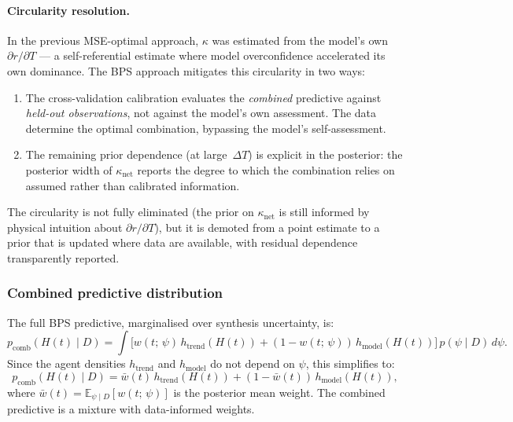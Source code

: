 \documentclass[11pt]{article}
\newcommand{\dT}{\Delta T}
\begin{document}
\paragraph{Circularity resolution.}
\label{sec:kappa_circularity}
In the previous MSE-optimal approach, $\kappa$ was estimated from the model's own $\partial r / \partial T$ --- a self-referential estimate where model overconfidence accelerated its own dominance.  The BPS approach mitigates this circularity in two ways:
\begin{enumerate}
  \item The cross-validation calibration evaluates the \emph{combined} predictive against \emph{held-out observations}, not against the model's own assessment.  The data determine the optimal combination, bypassing the model's self-assessment.
  \item The remaining prior dependence (at large~$\dT$) is explicit in the posterior: the posterior width of $\kappa_{\mathrm{net}}$ reports the degree to which the combination relies on assumed rather than calibrated information.
\end{enumerate}
The circularity is not fully eliminated (the prior on $\kappa_{\mathrm{net}}$ is still informed by physical intuition about $\partial r / \partial T$), but it is demoted from a point estimate to a prior that is updated where data are available, with residual dependence transparently reported.


\subsubsection{Combined predictive distribution}
\label{sec:combined_predictive}

The full BPS predictive, marginalised over synthesis uncertainty, is:
\begin{equation}
  p_{\mathrm{comb}}(H(t) \mid D) = \int \Big[w(t;\,\psi)\,h_{\mathrm{trend}}(H(t)) + (1 - w(t;\,\psi))\,h_{\mathrm{model}}(H(t))\Big]\,p(\psi \mid D)\,d\psi.
  \label{eq:full_predictive}
\end{equation}
Since the agent densities $h_{\mathrm{trend}}$ and $h_{\mathrm{model}}$ do not depend on $\psi$, this simplifies to:
\begin{equation}
  p_{\mathrm{comb}}(H(t) \mid D) = \bar{w}(t)\,h_{\mathrm{trend}}(H(t)) + (1 - \bar{w}(t))\,h_{\mathrm{model}}(H(t)),
  \label{eq:predictive_simplified}
\end{equation}
where $\bar{w}(t) = \mathbb{E}_{\psi \mid D}[w(t;\,\psi)]$ is the posterior mean weight.  The combined predictive is a mixture with data-informed weights.
\end{document}
